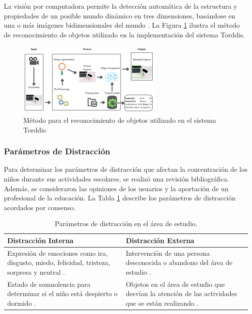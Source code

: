 \documentclass[a4paper,fleqn]{cas-sc}
\begin{document}
	La visión por computadora permite la detección automática de la estructura y propiedades de un posible mundo dinámico en tres dimensiones, basándose en una o más imágenes bidimensionales del mundo \citep{Cruz2013}. La Figura \ref{fig:ObjectRecognition} ilustra el método de reconocimiento de objetos utilizado en la implementación del sistema Torddis.
	
	\begin{figure}[hbt!]
		\centering
		\includegraphics[frame,scale=0.5, width=\linewidth]{figs/Figure_3}
		\caption{Método para el reconocimiento de objetos utilizado en el sistema Torddis.\label{fig:ObjectRecognition}}
	\end{figure} 
	
	\subsubsection{Parámetros de Distracción}
	Para determinar los parámetros de distracción que afectan la concentración de los niños durante sus actividades escolares, se realizó una revisión bibliográfica. Además, se consideraron las opiniones de los usuarios y la aportación de un profesional de la educación. La Tabla \ref{tab:DistractionParameters} describe los parámetros de distracción acordados por consenso.
	
	\begin{table}[hbt!]
		\centering
		\caption{Parámetros de distracción en el área de estudio. \label{tab:DistractionParameters}}
		\begin{tabular}{p{}p{}}
			\hline
			\multicolumn{1}{l}{\rule{0pt}{2.5ex}\textbf{Distracción Interna}} & \multicolumn{1}{l}{\rule{0pt}{2.5ex}\textbf{Distracción Externa}} \\ \hline
			Expresión de emociones como ira, disgusto, miedo, felicidad, tristeza, sorpresa y neutral \citep{Asish2022Detecting,Vettivel2018System,Pabba2022AnIntelligent}. & Intervención de una persona desconocida o abandono del área de estudio \citep{Vettivel2018System}. \\ \hline
			Estado de somnolencia para determinar si el niño está despierto o dormido \citep{Pabba2022AnIntelligent}. & Objetos en el área de estudio que desvían la atención de las actividades que se están realizando \citep{Asish2022Detecting,Pabba2022AnIntelligent}. \\ \hline
		\end{tabular}
	\end{table}
	
\end{document}
